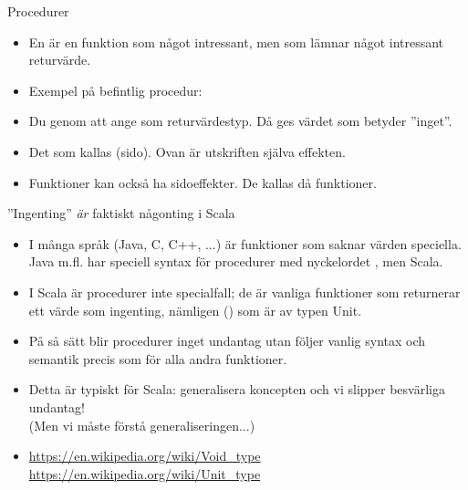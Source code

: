 \begin{Slide}{Procedurer}\SlideFontSmall
\begin{itemize}
\item En  är en funktion som  något intressant, men som  lämnar något intressant returvärde.
\item Exempel på befintlig procedur: 
\item Du  genom att ange \texttt{} som returvärdestyp. Då ges värdet \texttt{\Alert{()}} som betyder ''inget''.
\end{itemize}
\begin{itemize}
\item Det som  kallas (sido). Ovan är utskriften själva effekten.
\item Funktioner kan också ha sidoeffekter. De kallas då  funktioner.
\end{itemize}
\end{Slide}

\begin{Slide}{''Ingenting'' \emph{är} faktiskt någonting i Scala}
\begin{itemize}
\item I många språk (Java, C, C++, ...) är funktioner som saknar värden speciella.
 Java m.fl. har speciell syntax för procedurer med nyckelordet , men  Scala.

\item I Scala är procedurer inte specialfall; de är vanliga funktioner som returnerar ett värde som  ingenting, nämligen () som är av typen Unit.

\item På så sätt blir procedurer inget undantag utan följer vanlig syntax och semantik precis som för alla andra funktioner.

\item Detta är typiskt för Scala: generalisera koncepten och vi slipper besvärliga undantag! \\(Men vi måste förstå generaliseringen...)


\item [] {\SlideFontSmall
\url{https://en.wikipedia.org/wiki/Void_type}
\url{https://en.wikipedia.org/wiki/Unit_type}
}

\end{itemize}

\end{Slide}

